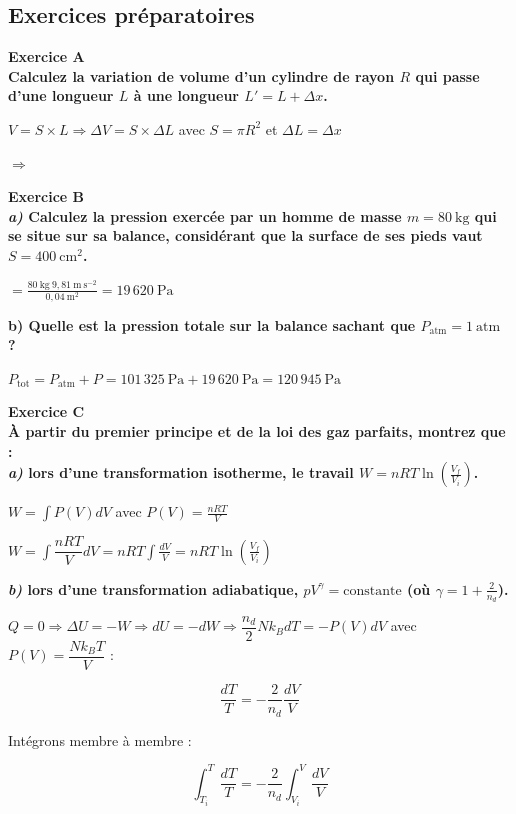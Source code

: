 \documentclass	[11pt, a4paper, openany]{book}
\newcommand{\exerc}[2]{\textbf{\Large Exercice #1\normalsize \\#2}}
\begin{document}
	\subsection{Exercices préparatoires}

\exerc{A}{Calculez la variation de volume d’un cylindre de rayon $R$ qui passe d’une longueur $L$ à
une longueur $L' = L + \Delta x$.}

	$V = S \times L \Rightarrow \Delta V = S \times \Delta L$ avec $S = \pi R^2$ et $\Delta L = \Delta x$
	
	$\Rightarrow$ 

\vspace{0,5cm}

\exerc{B}{\textit{a)} Calculez la pression exercée par un homme de masse $m = 80\ \text{kg}$ qui se situe sur sa
balance, considérant que la surface de ses pieds vaut $S = 400\ \text{cm}^2$.}
	
	 $= \frac{80\ \text{kg}\ 9,81\ \text{m}\ \text{s}^{-2}}{0,04\ \text{m}^2} = 19\,620\ \text{Pa}$
	
	\textbf{b) Quelle est la pression totale sur la balance sachant que $P_{\text{atm}} = 1\ \text{atm}$ ?}
	
	$P_{\text{tot}} = P_{\text{atm}} + P = 101\,325\ \text{Pa} + 19\,620\ \text{Pa} = 120\,945\ \text{Pa}$

\vspace{0,5cm}

\exerc{C}{À partir du premier principe et de la loi des gaz parfaits, montrez que :\\ \textit{a)} lors d’une transformation isotherme, le travail $W = nRT \ln(\frac{V_f}{V_i})$.}
	
	$W = \int P(V)dV$ avec $P(V) = \frac{nRT}{V}$
	
	$W = \int \dfrac{nRT}{V} dV = nRT \int \frac{dV}{V} = nRT \ln(\frac{V_f}{V_i})$
	
	\textbf{\textit{b)} lors d’une transformation adiabatique, $pV^{\gamma} = \text{constante}$ (où $\gamma = 1 + \frac{2}{n_d}$).}
	
	$Q = 0 \Rightarrow \Delta U = -W \Rightarrow dU = -dW \Rightarrow \dfrac{n_d}{2}Nk_BdT = -P(V)dV $ avec $P(V) = \dfrac{Nk_BT}{V}$ :
	
	$$\dfrac{dT}{T} = -\dfrac{2}{n_d}\dfrac{dV}{V}$$
	
	Intégrons membre à membre :
	
	$$\int_{T_i}^{T} \frac{dT}{T} = -\frac{2}{n_d} \int_{V_i}^{V} \frac{dV}{V}$$
	
\end{document}

